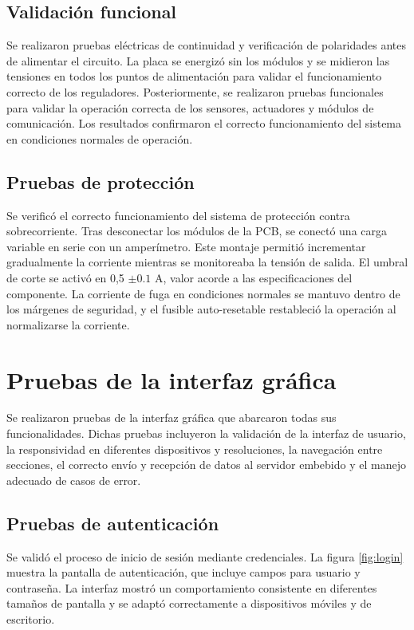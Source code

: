 \subsection{Validación funcional}
Se realizaron pruebas eléctricas de continuidad y verificación de polaridades antes de alimentar el circuito. La placa se energizó sin los módulos y se midieron las tensiones en todos los puntos de alimentación para validar el funcionamiento correcto de los reguladores. Posteriormente, se realizaron pruebas funcionales para validar la operación correcta de los sensores, actuadores y módulos de comunicación.  
Los resultados confirmaron el correcto funcionamiento del sistema en condiciones normales de operación.


\subsection{Pruebas de protección}
Se verificó el correcto funcionamiento del sistema de protección contra sobrecorriente. Tras desconectar los módulos de la PCB, se conectó una carga variable en serie con un amperímetro. Este montaje permitió incrementar gradualmente la corriente mientras se monitoreaba la tensión de salida. El umbral de corte se activó en 0,5 $\pm 0.1$ A, valor acorde a las especificaciones del componente. La corriente de fuga en condiciones normales se mantuvo dentro de los márgenes de seguridad, y el fusible auto-resetable restableció la operación al normalizarse la corriente.

\section{Pruebas de la interfaz gráfica}

Se realizaron pruebas de la interfaz gráfica que abarcaron todas sus funcionalidades. Dichas pruebas incluyeron la validación de la interfaz de usuario, la responsividad en diferentes dispositivos y resoluciones, la navegación entre secciones, el correcto envío y recepción de datos al servidor embebido y el manejo adecuado de casos de error.

\subsection{Pruebas de autenticación}
Se validó el proceso de inicio de sesión mediante credenciales. La figura \ref{fig:login} muestra la pantalla de autenticación, que incluye campos para usuario y contraseña. La interfaz mostró un comportamiento consistente en diferentes tamaños de pantalla y se adaptó correctamente a dispositivos móviles y de escritorio.

